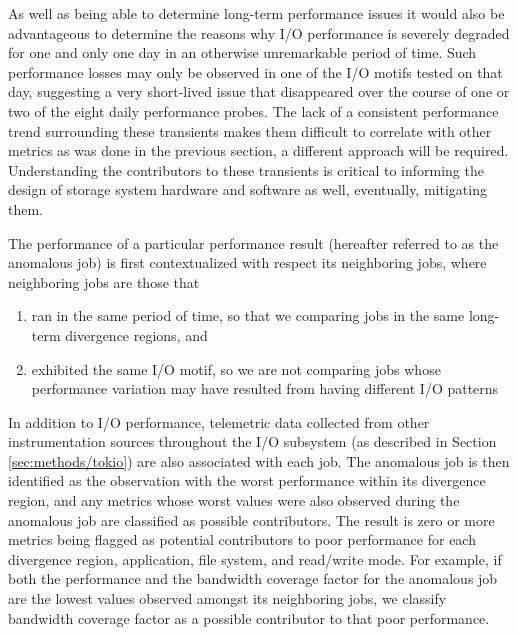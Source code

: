 As well as being able to determine long-term performance issues it would also be advantageous to determine the reasons why I/O performance is severely degraded for one and only one day in an otherwise unremarkable period of time.
Such performance losses may only be observed in one of the I/O motifs tested on that day, suggesting a very short-lived issue that disappeared over the course of one or two of the eight daily performance probes.
The lack of a consistent performance trend surrounding these transients makes them difficult to correlate with other metrics as was done in the previous section, a different approach will be required. Understanding the contributors to these transients is critical to informing the design of storage system hardware and software as well, eventually, mitigating them. 

The performance of a particular performance result (hereafter referred to as the anomalous job) is first contextualized with respect its neighboring jobs, where neighboring jobs are those that
\begin{enumerate}[leftmargin=*]
\item ran in the same period of time, so that we comparing jobs in the same long-term divergence regions, and
\item exhibited the same I/O motif, so we are not comparing jobs whose performance variation may have resulted from having different I/O patterns
\end{enumerate}

In addition to I/O performance, telemetric data collected from other instrumentation sources throughout the I/O subsystem (as described in Section \ref{sec:methods/tokio}) are also associated with each job.
The anomalous job is then identified as the observation with the worst performance within its divergence region, and any metrics whose worst values were also observed during the anomalous job are classified as possible contributors.
The result is zero or more metrics being flagged as potential contributors to poor performance for each divergence region, application, file system, and read/write mode. For example, if both the performance and the bandwidth coverage factor for the anomalous job are the lowest values observed amongst its neighboring jobs, we classify bandwidth coverage factor as a possible contributor to that poor performance.



